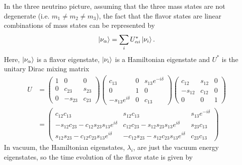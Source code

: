 In the three neutrino picture, assuming that the three mass states are not degenerate (i.e. $m_1 \neq m_2 \neq m_3$), the fact that the flavor states are linear combinations of mass states can be represented by
\begin{equation}
\ket{\nu_\alpha} = \sum_i U^*_{\alpha i} \ket{\nu_i}.
\end{equation}
Here, $\ket{\nu_\alpha}$ is a flavor eigenstate, $\ket{\nu_i}$ is a Hamiltonian eigenstate and $U^*$ is the unitary Dirac mixing matrix
\begin{equation}\label{eq:U}
\begin{aligned}
U &= \begin{pmatrix}
1 & 0 & 0 \\
0 & c_{23} & s_{23} \\
0 & -s_{23} & c_{23} \end{pmatrix}
\begin{pmatrix}
c_{13} & 0 & s_{13} e^{-i \delta} \\
0 & 1 & 0 \\
-s_{13} e^{i \delta} & 0 & c_{13} \end{pmatrix}
\begin{pmatrix}
c_{12} & s_{12} & 0 \\
-s_{12} & c_{12} & 0 \\
0 & 0 & 1 \end{pmatrix}
\\
& = \begin{pmatrix}
c_{12} c_{13} & s_{12} c_{13} & s_{13} e^{-i \delta} \\
-s_{12} c_{23} - c_{12} s_{23} s_{13} e^{i \delta} & c_{12} c_{23} - s_{12} s_{23} s_{13} e^{i \delta} & s_{23} c_{13} \\
s_{12} s_{23} - c_{12} c_{23} s_{13} e^{i \delta} & -c_{12} s_{23} - s_{12} c_{23} s_{13} e^{i \delta} & c_{23} c_{13} \end{pmatrix}
\end{aligned}
\end{equation}
 In vacuum, the Hamiltonian eigenstates, $\lambda_i$, are just the vacuum energy eigenstates, so the time evolution of the flavor state is given by
